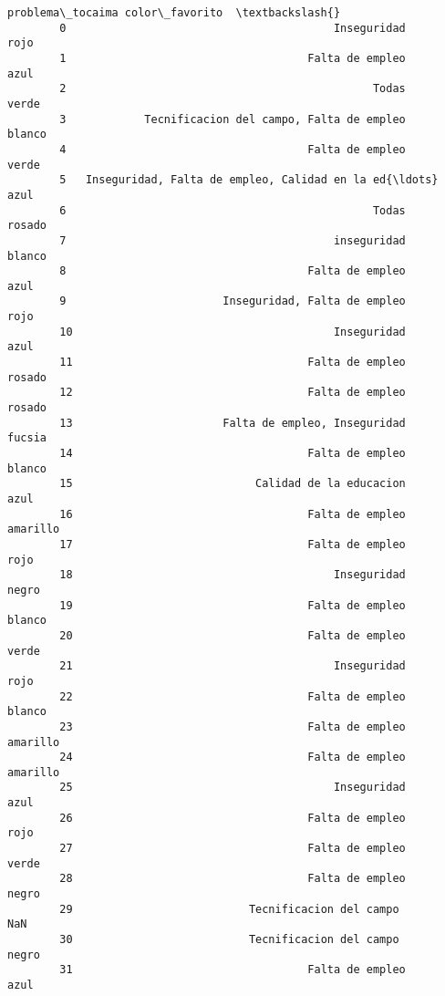 \documentclass[11pt]{article}
\begin{document}
\begin{Verbatim}[commandchars=\\\{\}]
                                             problema\_tocaima color\_favorito  \textbackslash{}
        0                                         Inseguridad           rojo   
        1                                     Falta de empleo           azul   
        2                                               Todas          verde   
        3            Tecnificacion del campo, Falta de empleo         blanco   
        4                                     Falta de empleo          verde   
        5   Inseguridad, Falta de empleo, Calidad en la ed{\ldots}           azul   
        6                                               Todas         rosado   
        7                                         inseguridad         blanco   
        8                                     Falta de empleo           azul   
        9                        Inseguridad, Falta de empleo           rojo   
        10                                        Inseguridad           azul   
        11                                    Falta de empleo         rosado   
        12                                    Falta de empleo         rosado   
        13                       Falta de empleo, Inseguridad         fucsia   
        14                                    Falta de empleo         blanco   
        15                            Calidad de la educacion           azul   
        16                                    Falta de empleo       amarillo   
        17                                    Falta de empleo           rojo   
        18                                        Inseguridad          negro   
        19                                    Falta de empleo         blanco   
        20                                    Falta de empleo          verde   
        21                                        Inseguridad           rojo   
        22                                    Falta de empleo         blanco   
        23                                    Falta de empleo       amarillo   
        24                                    Falta de empleo       amarillo   
        25                                        Inseguridad           azul   
        26                                    Falta de empleo           rojo   
        27                                    Falta de empleo          verde   
        28                                    Falta de empleo          negro   
        29                           Tecnificacion del campo             NaN   
        30                           Tecnificacion del campo           negro   
        31                                    Falta de empleo           azul   

\end{Verbatim}
\end{document}
